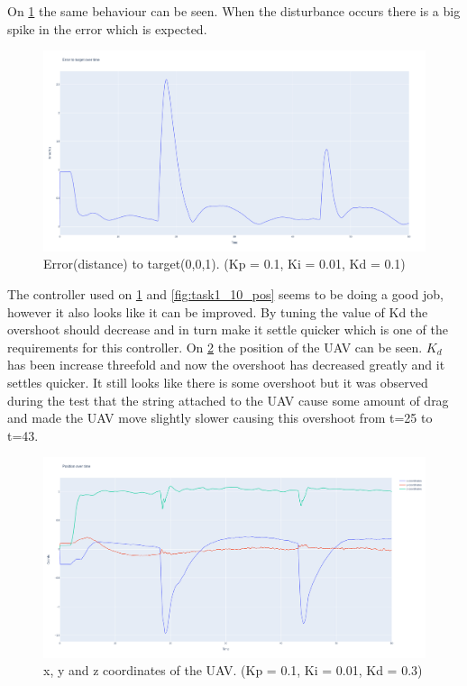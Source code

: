 \documentclass[conference]{IEEEtran}
\begin{document}
On \cref{fig:task1_10_err} the same behaviour can be seen. When the disturbance occurs there is a big spike in the error which is expected. 

\begin{figure}[hbtp]
	\centering
	\includegraphics[width=1.0\linewidth]{images/task1_10_err.png}
	\caption{Error(distance) to target(0,0,1). (Kp = 0.1, Ki = 0.01, Kd = 0.1)}
	\label{fig:task1_10_err}
\end{figure}

The controller used on \cref{fig:task1_10_err} and \cref{fig:task1_10_pos} seems to be doing a good job, however it also looks like it can be improved. By tuning the value of Kd the overshoot should decrease and in turn make it settle quicker which is one of the requirements for this controller. On \cref{fig:task1_11_pos} the position of the UAV can be seen. $K_d$ has been increase threefold and now the overshoot has decreased greatly and it settles quicker. It still looks like there is some overshoot but it was observed during the test that the string attached to the UAV cause some amount of drag and made the UAV move slightly slower causing this overshoot from t=25 to t=43.

\begin{figure}[hbtp]
	\centering
	\includegraphics[width=1.0\linewidth]{images/task1_11_pos.png}
	\caption{x, y and z coordinates of the UAV. (Kp = 0.1, Ki = 0.01, Kd = 0.3)}
	\label{fig:task1_11_pos}
\end{figure}
\end{document}

